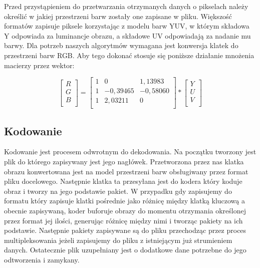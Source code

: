 \documentclass[twoside]{projektInzynierskiMS}
\begin{document}
Przed przystąpieniem do przetwarzania otrzymanych danych o pikselach należy określić w jakiej przestrzeni barw zostały one zapisane w pliku. Większość formatów zapisuje piksele korzystając z modelu barw YUV, w którym składowa Y odpowiada za luminancje obrazu, a składowe UV odpowiadają za nadanie mu barwy. Dla potrzeb naszych algorytmów wymagana jest konwersja klatek do przestrzeni barw RGB. Aby tego dokonać stosuje się poniższe działanie mnożenia macierzy przez wektor:

\[
\begin{bmatrix}
	R\\[0.3em]
	G\\[0.3em]
	B\\[0.3em]
\end{bmatrix}
=
\begin{bmatrix}
	1 & 0 & 1,13983\\[0.3em]
	1 & -0,39465 & -0,58060\\[0.3em]
	1 & 2,03211 & 0\\[0.3em]
\end{bmatrix}
*
\begin{bmatrix}
Y\\[0.3em]
U\\[0.3em]
V\\[0.3em]
\end{bmatrix}
\]
\subsection{Kodowanie}
Kodowanie jest procesem odwrotnym do dekodowania. Na początku tworzony jest plik do którego zapisywany jest jego nagłówek. Przetworzona przez nas klatka obrazu konwertowana jest na model przestrzeni barw obsługiwany przez format pliku docelowego. Następnie klatka ta przesyłana jest do kodera który koduje obraz i tworzy na jego podstawie pakiet. W przypadku gdy zapisujemy do formatu który zapisuje klatki pośrednie jako różnicę między klatką kluczową a obecnie zapisywaną, koder buforuje obrazy do momentu otrzymania określonej przez format jej ilości, generując różnicę między nimi i tworząc pakiety na ich podstawie. Następnie pakiety zapisywane są do pliku przechodząc przez proces multipleksowania jeżeli zapisujemy do pliku z istniejącym już strumieniem danych. Ostatecznie plik uzupełniany jest o dodatkowe dane potrzebne do jego odtworzenia i zamykany.
\end{document}
